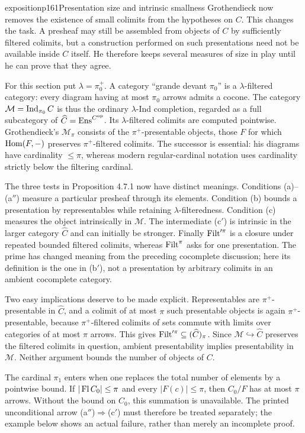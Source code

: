\begin{dcomment}{exposition}{p161}{Presentation size and intrinsic smallness}
Grothendieck now removes the existence of small colimits from the hypotheses on $C$. This changes the task. A presheaf may still be assembled from objects of $C$ by sufficiently filtered colimits, but a construction performed on such presentations need not be available inside $C$ itself. He therefore keeps several measures of size in play until he can prove that they agree.

For this section put $\lambda=\pi_0^+$. A category ``grande devant $\pi_0$'' is a $\lambda$-filtered category: every diagram having at most $\pi_0$ arrows admits a cocone. The category $\mathcal M=\operatorname{Ind}_{\pi_0}C$ is thus the ordinary $\lambda$-Ind completion, regarded as a full subcategory of $\widehat C=\mathrm{Ens}^{C^{\mathrm{op}}}$. Its $\lambda$-filtered colimits are computed pointwise. Grothendieck's $\mathcal M_\pi$ consists of the $\pi^+$-presentable objects, those $F$ for which $\operatorname{Hom}(F,-)$ preserves $\pi^+$-filtered colimits. The successor is essential: his diagrams have cardinality $\leq\pi$, whereas modern regular-cardinal notation uses cardinality strictly below the filtering cardinal.

The three tests in Proposition 4.7.1 now have distinct meanings. Conditions (a)--(a$''$) measure a particular presheaf through its elements. Condition (b) bounds a presentation by representables while retaining $\lambda$-filteredness. Condition (c) measures the object intrinsically in $\mathcal M$. The intermediate (c$'$) is intrinsic in the larger category $\widehat C$ and can initially be stronger. Finally $\operatorname{Filt}'^\pi$ is a closure under repeated bounded filtered colimits, whereas $\operatorname{Filt}^\pi$ asks for one presentation. The prime has changed meaning from the preceding cocomplete discussion; here its definition is the one in (b$'$), not a presentation by arbitrary colimits in an ambient cocomplete category.

Two easy implications deserve to be made explicit. Representables are $\pi^+$-presentable in $\widehat C$, and a colimit of at most $\pi$ such presentable objects is again $\pi^+$-presentable, because $\pi^+$-filtered colimits of sets commute with limits over categories of at most $\pi$ arrows. This gives $\operatorname{Filt}'^\pi\subseteq(\widehat C)_\pi$. Since $\mathcal M\hookrightarrow\widehat C$ preserves the filtered colimits in question, ambient presentability implies presentability in $\mathcal M$. Neither argument bounds the number of objects of $C$.

The cardinal $\pi_1$ enters when one replaces the total number of elements by a pointwise bound. If $|\operatorname{Fl} C_0|\leq\pi$ and every $|F(c)|\leq\pi$, then $C_0/F$ has at most $\pi$ arrows. Without the bound on $C_0$, this summation is unavailable. The printed unconditional arrow (a$''$)$\Rightarrow$(c$'$) must therefore be treated separately; the example below shows an actual failure, rather than merely an incomplete proof.
\end{dcomment}


